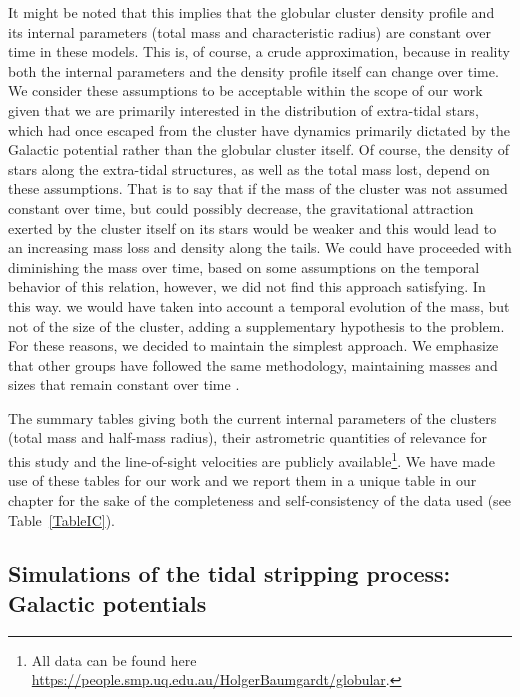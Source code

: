         It might be noted that this implies that the globular cluster density profile and its internal parameters (total mass and characteristic radius) are constant over time in these models. This is, of course, a crude approximation, because in reality both the internal parameters and the density profile itself can change over time. We consider these assumptions to be acceptable within the scope of our work given that we are primarily interested in the distribution of extra-tidal stars, which had once escaped from the cluster have dynamics primarily dictated by the Galactic potential rather than the globular cluster itself. Of course,  the density of stars along the extra-tidal structures, as well as the total mass lost, depend on these assumptions. That is to say that if the mass of the cluster was not assumed constant over time, but could possibly decrease, the gravitational attraction exerted by the cluster itself on its stars would be weaker and this would lead to an increasing mass loss and density along the tails. We could have proceeded with diminishing the mass over time, based on some assumptions on the temporal behavior of this relation, however, we did not find this approach satisfying. In this way. we would have taken into account a temporal evolution of the mass, but not of the size of the cluster, adding a supplementary hypothesis to the problem. For these reasons, we decided to maintain the simplest approach. We emphasize that other groups have followed the same methodology, maintaining masses and sizes that remain constant over time \citep[see, e.g.,][]{2019MNRAS.488.1535P}.

        The summary tables giving both the current internal parameters of the clusters (total mass and half-mass radius), their astrometric quantities of relevance for this study and the line-of-sight velocities are publicly available\footnote{All data can be found here \url{https://people.smp.uq.edu.au/HolgerBaumgardt/globular}.}. We have made use of these tables for our work and we report them in a unique table in our chapter for the sake of the completeness and self-consistency of the data used (see Table~\ref{TableIC}). 

    \subsection{Simulations of the tidal stripping process: Galactic potentials}\label{galmod}
    

